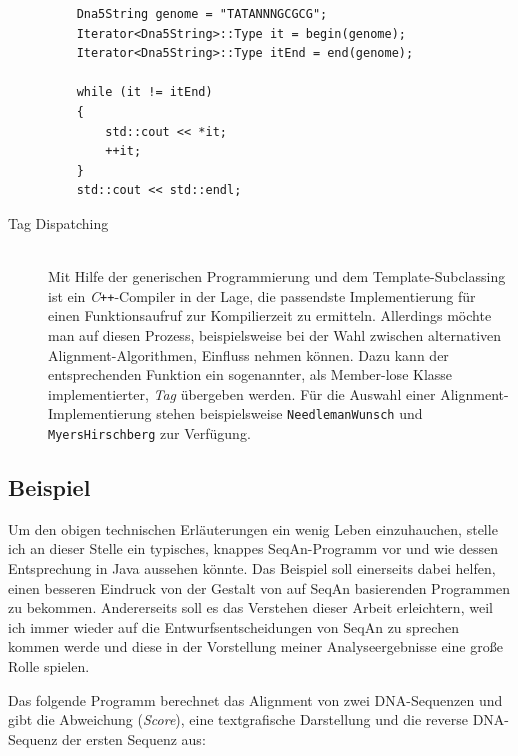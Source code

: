 \begin{description}
\begin{verbatim}
    Dna5String genome = "TATANNNGCGCG";
    Iterator<Dna5String>::Type it = begin(genome);
    Iterator<Dna5String>::Type itEnd = end(genome);

    while (it != itEnd)
    {
        std::cout << *it;
        ++it;
    }
    std::cout << std::endl;
\end{verbatim}
  
  \item[Tag Dispatching] \hfill \\
  Mit Hilfe der generischen Programmierung und dem Template-Subclassing ist ein \textit{C{}}\verb!++!-Compiler in der Lage, die passendste Implementierung für einen Funktionsaufruf zur Kompilierzeit zu ermitteln. Allerdings möchte man auf diesen Prozess, beispielsweise bei der Wahl zwischen alternativen Alignment-Algorithmen, Einfluss nehmen können. Dazu kann der entsprechenden Funktion ein sogenannter, als Member-lose Klasse implementierter, \textit{Tag} übergeben werden. Für die Auswahl einer Alignment-Implementierung stehen beispielsweise \texttt{NeedlemanWunsch} und \texttt{MyersHirschberg} zur Verfügung.
\end{description}



\subsection{Beispiel}

Um den obigen technischen Erläuterungen ein wenig Leben einzuhauchen, stelle ich an dieser Stelle ein typisches, knappes SeqAn-Programm vor und wie dessen Entsprechung in Java aussehen könnte. Das Beispiel soll einerseits dabei helfen, einen besseren Eindruck von der Gestalt von auf SeqAn basierenden Programmen zu bekommen. Andererseits soll es das Verstehen dieser Arbeit erleichtern, weil ich immer wieder auf die Entwurfsentscheidungen von SeqAn zu sprechen kommen werde und diese in der Vorstellung meiner Analyseergebnisse eine große Rolle spielen.

Das folgende Programm berechnet das Alignment von zwei DNA-Sequenzen und gibt die Abweichung (\textit{Score}), eine textgrafische Darstellung und die reverse DNA-Sequenz der ersten Sequenz aus:

